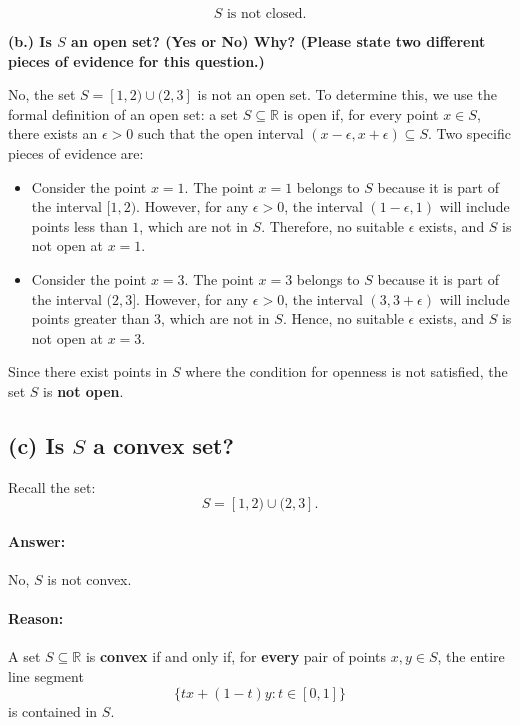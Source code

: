 \documentclass[12pt]{article}
\begin{document}
\[
\boxed{ S \text{ is not closed.} }
\]
\newpage

\noindent \textbf{(b.) Is $S$ an open set? (Yes or No) Why? (Please state two different pieces of evidence for this question.)}

No, the set $S = [1, 2) \cup (2, 3]$ is not an open set. To determine this, we use the formal definition of an open set: a set $S \subseteq \mathbb{R}$ is open if, for every point $x \in S$, there exists an $\epsilon > 0$ such that the open interval $(x - \epsilon, x + \epsilon) \subseteq S$. Two specific pieces of evidence are:

\begin{itemize}
    \item Consider the point $x = 1$. The point $x = 1$ belongs to $S$ because it is part of the interval $[1, 2)$. However, for any $\epsilon > 0$, the interval $(1 - \epsilon, 1)$ will include points less than $1$, which are not in $S$. Therefore, no suitable $\epsilon$ exists, and $S$ is not open at $x = 1$.
    
    \item Consider the point $x = 3$. The point $x = 3$ belongs to $S$ because it is part of the interval $(2, 3]$. However, for any $\epsilon > 0$, the interval $(3, 3 + \epsilon)$ will include points greater than $3$, which are not in $S$. Hence, no suitable $\epsilon$ exists, and $S$ is not open at $x = 3$.
\end{itemize}

\noindent Since there exist points in $S$ where the condition for openness is not satisfied, the set $S$ is \textbf{not open}.

\bigskip
\newpage
\subsection*{(c) Is \(S\) a convex set?}

\noindent Recall the set:
\[
S = [1, 2) \cup (2, 3].
\]

\paragraph{Answer:} No, \(S\) is not convex.

\paragraph{Reason:}

A set \(S \subseteq \mathbb{R}\) is \textbf{convex} if and only if, for \textbf{every} pair of points \(x, y \in S\), the entire line segment
\[
\{ tx + (1-t)y : t \in [0,1] \}
\]
is contained in \(S\).
\end{document}
